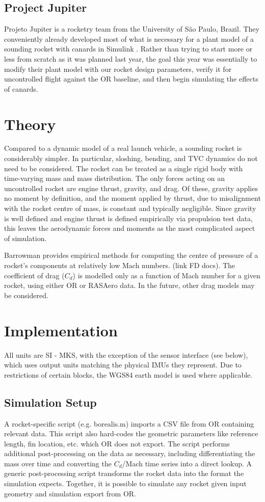 \subsection{Project Jupiter}
Projeto Jupiter is a rocketry team from the University of São Paulo, Brazil. They conveniently already developed most of what is necessary for a plant model of a sounding rocket with canards in Simulink \cite{jupiter-canards}. Rather than trying to start more or less from scratch as it was planned last year, the goal this year was essentially to modify their plant model with our rocket design parameters, verify it for uncontrolled flight against the OR baseline, and then begin simulating the effects of canards.

\section{Theory}
Compared to a dynamic model of a real launch vehicle, a sounding rocket is considerably simpler. In particular, sloshing, bending, and TVC dynamics do not need to be considered. The rocket can be treated as a single rigid body with time-varying mass and mass distribution. The only forces acting on an uncontrolled rocket are engine thrust, gravity, and drag. Of these, gravity applies no moment by definition, and the moment applied by thrust, due to misalignment with the rocket centre of mass, is constant and typically negligible. Since gravity is well defined and engine thrust is defined empirically via propulsion test data, this leaves the aerodynamic forces and moments as the most complicated aspect of simulation.

Barrowman provides empirical methods for computing the centre of pressure of a rocket's components at relatively low Mach numbers. (link FD docs). The coefficient of drag ($C_d$) is modelled only as a function of Mach number for a given rocket, using either OR or RASAero data. In the future, other drag models may be considered.

\section{Implementation}
All units are SI - MKS, with the exception of the sensor interface (see below), which uses output units matching the physical IMUs they represent. Due to restrictions of certain blocks, the WGS84 earth model is used where applicable.

\subsection{Simulation Setup}
A rocket-specific script (e.g. borealis.m) imports a CSV file from OR containing relevant data. This script also hard-codes the geometric parameters like reference length, fin location, etc. which OR does not export. The script performs additional post-processing on the data as necessary, including differentiating the mass over time and converting the $C_d$/Mach time series into a direct lookup. A generic post-processing script transforms the rocket data into the format the simulation expects. Together, it is possible to simulate any rocket given input geometry and simulation export from OR.

